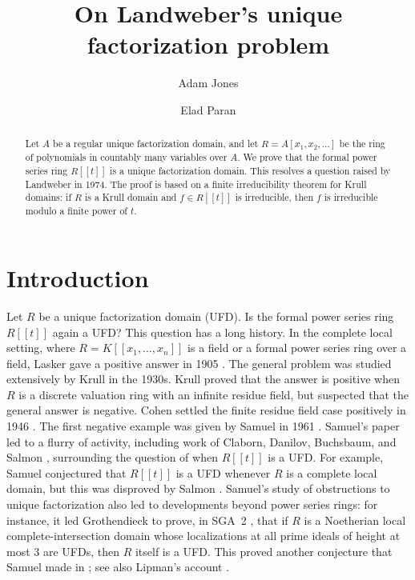 \documentclass{article}
\theoremstyle{plain}
\theoremstyle{definition}
\theoremstyle{remark}
\theoremstyle{plain}
\begin{document}
\title{On Landweber's unique factorization problem}
\author[1]{Adam Jones}
\author[2]{Elad Paran}




\maketitle

    

\begin{abstract}
\noindent Let $A$ be a regular unique factorization domain, and let $R = A[x_1,x_2,\ldots]$ be the ring of polynomials in countably many variables over $A$. We prove that the formal power series ring $R[[t]]$ is a unique factorization domain. This resolves a question raised by Landweber in 1974. The proof is based on a finite irreducibility theorem for Krull domains: if $R$ is a Krull domain and $f\in R[[t]]$ is irreducible, then $f$ is irreducible modulo a finite power of $t$.
\end{abstract}



\section{Introduction}\label{sec:introduction}

Let $R$ be a unique factorization domain (UFD). Is the formal power series ring $R[[t]]$ again a UFD? This question has a long history. In the complete local setting, where $R=K[[x_1,\ldots,x_n]]$ is a field or a formal power series ring over a field, Lasker gave a positive answer in 1905 \cite{Lasker05}. The general problem was studied extensively by Krull in the 1930s. Krull proved \cite{Krull38} that the answer is positive when $R$ is a discrete valuation ring with an infinite residue field, but suspected that the general answer is negative. Cohen settled the finite residue field case positively in 1946 \cite{Cohen46}. The first negative example was given by Samuel in 1961 \cite[\S4]{Samuel61}. Samuel's paper led to a flurry of activity, including work of Claborn, Danilov, Buchsbaum, and Salmon \cite{Claborn65,Danilov65,Buchsbaum61, Salmon64}, surrounding the question of when $R[[t]]$ is a UFD. For example, Samuel conjectured that $R[[t]]$ is a UFD whenever $R$ is a complete local domain, but this was disproved by Salmon \cite{Salmon64}. Samuel's study of obstructions to unique factorization also led to developments beyond power series rings: for instance, it led Grothendieck to prove, in SGA~2 \cite[Expos\'e XI, Corollaire 3.14]{Grothendieck68}, that if $R$ is a Noetherian local complete-intersection domain whose localizations at all prime ideals of height at most $3$ are UFDs, then $R$ itself is a UFD. This proved another conjecture that Samuel made in \cite[\S4]{Samuel61}; see also Lipman's account \cite[p.~531]{Lipman75}.
\end{document}
